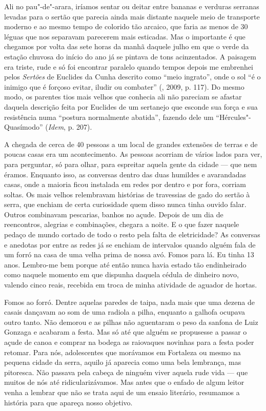 Ali no pau"-de"-arara, iríamos sentar ou deitar entre bananas e verduras
serranas levadas para o sertão que parecia ainda mais distante naquele
meio de transporte moderno e ao mesmo tempo de colorido tão arcaico, que
faria as menos de 30 léguas que nos separavam parecerem mais esticadas.
Mas o importante é que chegamos por volta das sete horas da manhã
daquele julho em que o verde da estação chuvosa do início do ano já se pintava
de tons acinzentados. A paisagem era triste, rude e só foi encontrar paralelo
quando tempos depois me embrenhei pelos \emph{Sertões} de Euclides da
Cunha descrito como ``meio ingrato'', onde o sol ``é o inimigo que é
forçoso evitar, iludir ou combater'' (, 2009, p. 117). Do mesmo
modo, os parentes tios mais velhos que conhecia ali não pareciam se
afastar daquela descrição feita por Euclides de um sertanejo que esconde
sua força e sua resistência numa ``postura normalmente abatida'',
fazendo dele um ``Hércules"-Quasímodo'' (\emph{Idem}, p. 207).

A chegada de cerca de 40 pessoas a um local de grandes extensões de
terras e de poucas casas era um acontecimento. As pessoas acorriam de
vários lados para ver, para perguntar, só para olhar, para espreitar
aquela gente da cidade --- que nem éramos. Enquanto isso, as conversas
dentro das duas humildes e avarandadas casas, onde a maioria ficou
instalada em redes por dentro e por fora, corriam soltas. Os mais velhos
relembravam histórias de travessias de gado do sertão à serra, que
enchiam de certa curiosidade quem disso nunca tinha ouvido falar. Outros
combinavam pescarias, banhos no açude. Depois de um dia de reencontros,
alegrias e combinações, chegara a noite. E o que fazer naquele pedaço de
mundo cortado de todo o resto pela falta de eletricidade? As conversas e
anedotas por entre as redes já se enchiam de intervalos quando alguém
fala de um forró na casa de uma velha prima de nossa avó. Fomos para lá.
Eu tinha 13 anos. Lembro-me bem porque até então nunca havia estado tão
endinheirado como naquele momento em que dispunha daquela cédula de
dinheiro novo, valendo cinco reais, recebida em troca de minha atividade
de aguador de hortas.

Fomos ao forró. Dentre aquelas paredes de taipa, nada mais que uma dezena de casais
dançavam ao som de uma radiola a pilha, enquanto a galhofa ocupava outro
tanto. Não demorou e as pilhas não aguentaram o peso da sanfona de Luiz
Gonzaga e acabaram a festa. Mas só até que alguém se propusesse a passar
o açude de canoa e comprar na bodega as raiovaques novinhas para a festa
poder retomar. Para nós, adolescentes que morávamos em Fortaleza ou
mesmo na pequena cidade da serra, aquilo já aparecia como uma bela
lembrança, mas pitoresca. Não passava pela cabeça de ninguém viver
aquela rude vida --- que muitos de nós até ridicularizávamos. Mas antes
que o enfado de algum leitor venha a lembrar que não se trata aqui de
um ensaio literário, resumamos a história para que apareça nosso objetivo.

